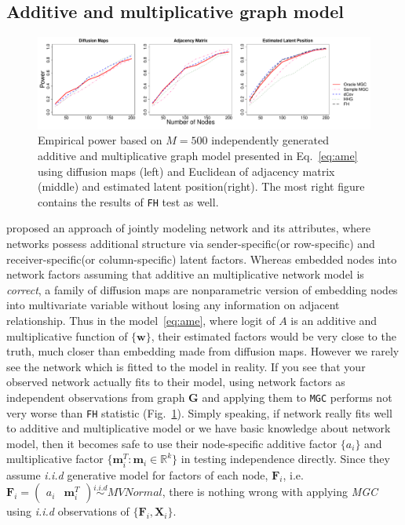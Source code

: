 \documentclass[12pt]{article}
\theoremstyle{definition}
\begin{document}
\subsection{Additive and multiplicative graph model}

\begin{figure}[h]
	\centering
	\includegraphics[width=7in]{../Figure/ame.pdf}
	\caption{Empirical power based on $M = 500$ independently generated additive and multiplicative graph model presented in Eq.~\ref{eq:ame} using diffusion maps (left) and Euclidean of adjacency matrix (middle)  and estimated latent position(right). The most right figure contains the results of \texttt{FH} test as well.}
		\label{fig:ame}
\end{figure}

\cite{hoff2002latent} proposed an approach of jointly modeling network and its attributes, where networks possess additional structure via sender-specific(or row-specific) and receiver-specific(or column-specific) latent factors. Whereas \cite{fosdick2015testing} embedded nodes into network factors assuming that additive an multiplicative network model is \textit{correct}, a family of diffusion maps are nonparametric version of embedding nodes into multivariate variable without losing any information on adjacent relationship. Thus in the model~\ref{eq:ame}, where logit of $A$ is an additive and multiplicative function of $\{\mathbf{w} \}$, their estimated factors would be very close to the truth, much closer than embedding made from diffusion maps. However we rarely see the network which is fitted to the model in reality. If you see that your observed network actually fits to their model, using network factors as independent observations from graph $\mathbf{G}$ and applying them to \texttt{MGC} performs not very worse than \texttt{FH} statistic (Fig.~\ref{fig:ame}).
Simply speaking, if network really fits well to additive and multiplicative model or we have basic knowledge about network model, then it becomes safe to use their node-specific additive factor $\{ a_{i} \}$ and multiplicative factor $\{ \mathbf{m}^{T}_{i} : \mathbf{m}_{i} \in \mathbb{R}^{k} \}$ in testing independence directly. Since they assume \textit{i.i.d} generative model for factors of each node, $\mathbf{F}_{i}$, i.e. $\mathbf{F}_{i} = \begin{pmatrix} a_{i} & \mathbf{m}^{T}_{i} \end{pmatrix} \overset{i.i.d}{\sim} MVNormal$, there is nothing wrong with applying \textit{MGC} using \textit{i.i.d} observations of $\{ \mathbf{F}_{i}, \mathbf{X}_{i} \}$.   
	
\end{document}
